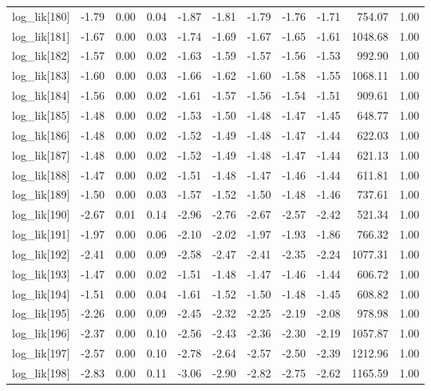 \begin{table}[ht]
\begin{tabular}{rrrrrrrrrrr}
  log\_lik[180] & -1.79 & 0.00 & 0.04 & -1.87 & -1.81 & -1.79 & -1.76 & -1.71 & 754.07 & 1.00 \\ 
  log\_lik[181] & -1.67 & 0.00 & 0.03 & -1.74 & -1.69 & -1.67 & -1.65 & -1.61 & 1048.68 & 1.00 \\ 
  log\_lik[182] & -1.57 & 0.00 & 0.02 & -1.63 & -1.59 & -1.57 & -1.56 & -1.53 & 992.90 & 1.00 \\ 
  log\_lik[183] & -1.60 & 0.00 & 0.03 & -1.66 & -1.62 & -1.60 & -1.58 & -1.55 & 1068.11 & 1.00 \\ 
  log\_lik[184] & -1.56 & 0.00 & 0.02 & -1.61 & -1.57 & -1.56 & -1.54 & -1.51 & 909.61 & 1.00 \\ 
  log\_lik[185] & -1.48 & 0.00 & 0.02 & -1.53 & -1.50 & -1.48 & -1.47 & -1.45 & 648.77 & 1.00 \\ 
  log\_lik[186] & -1.48 & 0.00 & 0.02 & -1.52 & -1.49 & -1.48 & -1.47 & -1.44 & 622.03 & 1.00 \\ 
  log\_lik[187] & -1.48 & 0.00 & 0.02 & -1.52 & -1.49 & -1.48 & -1.47 & -1.44 & 621.13 & 1.00 \\ 
  log\_lik[188] & -1.47 & 0.00 & 0.02 & -1.51 & -1.48 & -1.47 & -1.46 & -1.44 & 611.81 & 1.00 \\ 
  log\_lik[189] & -1.50 & 0.00 & 0.03 & -1.57 & -1.52 & -1.50 & -1.48 & -1.46 & 737.61 & 1.00 \\ 
  log\_lik[190] & -2.67 & 0.01 & 0.14 & -2.96 & -2.76 & -2.67 & -2.57 & -2.42 & 521.34 & 1.00 \\ 
  log\_lik[191] & -1.97 & 0.00 & 0.06 & -2.10 & -2.02 & -1.97 & -1.93 & -1.86 & 766.32 & 1.00 \\ 
  log\_lik[192] & -2.41 & 0.00 & 0.09 & -2.58 & -2.47 & -2.41 & -2.35 & -2.24 & 1077.31 & 1.00 \\ 
  log\_lik[193] & -1.47 & 0.00 & 0.02 & -1.51 & -1.48 & -1.47 & -1.46 & -1.44 & 606.72 & 1.00 \\ 
  log\_lik[194] & -1.51 & 0.00 & 0.04 & -1.61 & -1.52 & -1.50 & -1.48 & -1.45 & 608.82 & 1.00 \\ 
  log\_lik[195] & -2.26 & 0.00 & 0.09 & -2.45 & -2.32 & -2.25 & -2.19 & -2.08 & 978.98 & 1.00 \\ 
  log\_lik[196] & -2.37 & 0.00 & 0.10 & -2.56 & -2.43 & -2.36 & -2.30 & -2.19 & 1057.87 & 1.00 \\ 
  log\_lik[197] & -2.57 & 0.00 & 0.10 & -2.78 & -2.64 & -2.57 & -2.50 & -2.39 & 1212.96 & 1.00 \\ 
  log\_lik[198] & -2.83 & 0.00 & 0.11 & -3.06 & -2.90 & -2.82 & -2.75 & -2.62 & 1165.59 & 1.00 \\ 

\end{tabular}
\end{table}
